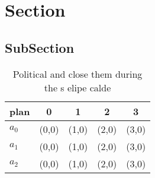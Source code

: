\documentclass[a4paper]{article}
\begin{document}
\section{Section}

\subsection{SubSection}

\begin{table}
\begin{adjustbox}{width=0.6\columnwidth}
\begin{tabular}{|l|l|l|l|l|}
\hline
\textbf{plan} & \multicolumn{1}{c|}{\textbf{0}} & \multicolumn{1}{c|}{\textbf{1}} & \multicolumn{1}{c|}{\textbf{2}} & \multicolumn{1}{c|}{\textbf{3}} \\ \hline
\textbf{$a_0$}  & (0,0) & (1,0) & (2,0) & (3,0) \\ \hline
\textbf{$a_1$}  & (0,0) & (1,0) & (2,0) & (3,0) \\ \hline
\textbf{$a_2$}  & (0,0) & (1,0) & (2,0) & (3,0) \\ \hline
\end{tabular}
\end{adjustbox}
\caption{Political and close them during the s elipe calde
}
\end{table}
\end{document}
